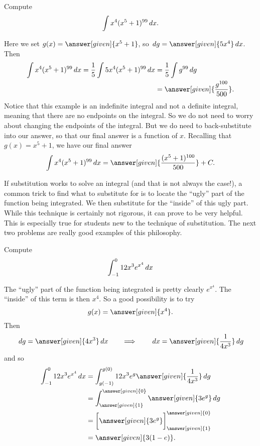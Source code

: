 \documentclass{ximera}
\begin{document}
\begin{example}
Compute
\[
\int x^4(x^5+1)^{99} \,d x.
\]
\begin{explanation}
Here we set $g(x) =  \answer[given]{x^5+1}$, so $\d g =  \answer[given]{5x^4} \d x$.  Then
\begin{align*}
\int x^4(x^5+1)^{99} \d x = \frac{1}{5} \int 5x^4 (x^5+1)^{99} \d x &= \frac{1}{5} \int g^{99} \d g\\
&= \answer[given]{\frac{g^{100}}{500}}.
\end{align*}
Notice that this example is an indefinite integral and not a definite integral, meaning that there are no endpoints on the integral.  
So we do not need to worry about changing the endpoints of the integral.  
But we do need to back-substitute into our answer, so that our final answer is a function of $x$.  
Recalling that $g(x) =  x^5+1$, we have our final answer
\[
\int x^4(x^5+1)^{99} \d x= \answer[given]{\frac{(x^5+1)^{100}}{500}}+C.
\]
\end{explanation}
\end{example}


If substitution works to solve an integral (and that is not always the case!), a common trick to find what to substitute for is to locate the ``ugly'' part of the function being integrated.
We then substitute for the ``inside'' of this ugly part.  
While this technique is certainly not rigorous, it can prove to be very helpful.  
This is especially true for students new to the technique of substitution.  
The next two problems are really good examples of this philosophy.

\begin{example}
Compute
\[
\int_{-1}^0 12x^3 e^{x^4} \,d x
\]
\begin{explanation}
The ``ugly'' part of the function being integrated is pretty clearly $e^{x^4}$.  
The ``inside'' of this term is then $x^4$.  
So a good possibility is to try 
\[
g(x) =  \answer[given]{x^4}.
\]
Then
\[
\d g =  \answer[given]{4x^3} \d x 	\qquad	\Longrightarrow	\qquad	\d x = \answer[given]{\frac{1}{4x^3}} \d g
\]
and so
\begin{align*}
\int_{-1}^0 12x^3 e^{x^4} \d x &= \int_{g(-1)}^{g(0)} 12 x^3 e^g \answer[given]{\frac{1}{4x^3}} \d g  \\
&= \int_{\answer[given]{1}}^{\answer[given]{0}} \answer[given]{3 e^g} \d g  \\
&= \eval{\answer[given]{3e^g}}_{\answer[given]{1}}^{\answer[given]{0}}  \\
&= \answer[given]{3(1-e)}.
\end{align*}
\end{explanation}
\end{example}
\end{document}
